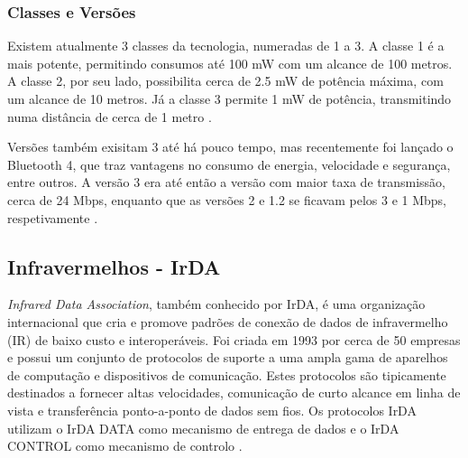 \documentclass[conference]{IEEEtran}
\begin{document}
\subsubsection{Classes e Versões}

Existem atualmente 3 classes da tecnologia, numeradas de 1 a 3. 
A classe 1 é a mais potente, permitindo consumos até 100 mW com um alcance de 100 metros. 
A classe 2, por seu lado, possibilita cerca de 2.5 mW de potência máxima, com um alcance de 10 metros. 
Já a classe 3 permite 1 mW de potência, transmitindo numa distância de cerca de 1 metro \cite{bluetoothwiki}.

Versões também exisitam 3 até há pouco tempo, mas recentemente foi lançado o Bluetooth 4, que traz vantagens no consumo de energia, velocidade e segurança, entre outros. 
A versão 3 era até então a versão com maior taxa de transmissão, cerca de 24 Mbps, enquanto que as versões 2 e 1.2 se ficavam pelos 3 e 1 Mbps, respetivamente \cite{bluetoothwiki}.




\subsection{Infravermelhos - IrDA}

\textit{Infrared Data Association}, também conhecido por IrDA, é uma organização internacional que cria e promove padrões de conexão de dados de infravermelho (IR) de baixo custo e interoperáveis.
Foi criada em 1993 por cerca de 50 empresas e possui um conjunto de protocolos de suporte a uma ampla gama de aparelhos de computação e dispositivos de comunicação. 
Estes protocolos são tipicamente destinados a fornecer altas velocidades, comunicação de curto alcance em linha de vista e transferência ponto-a-ponto de dados sem fios. 
Os protocolos IrDA utilizam o IrDA DATA como mecanismo de entrega de dados e o IrDA CONTROL como mecanismo de controlo \cite{infareddd}.
\end{document}
